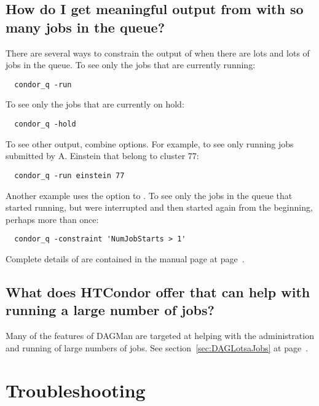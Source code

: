 \subsection*{How do I get meaningful output from  with so many jobs in the queue?}
 
There are several ways to constrain the output of  when there are
lots and lots of jobs in the queue.
To see only the jobs that are currently running:
\begin{verbatim}
  condor_q -run
\end{verbatim}
To see only the jobs that are currently on hold:
\begin{verbatim}
  condor_q -hold
\end{verbatim}
To see other output,  combine options.
For example, to see only running jobs submitted by A. Einstein
that belong to cluster 77:
\begin{verbatim}
  condor_q -run einstein 77
\end{verbatim}
Another example uses the  option to .
To see only the jobs in the queue that started running,
but were interrupted and then started again from the beginning,
perhaps more than once: 
\footnotesize
\begin{verbatim}
  condor_q -constraint 'NumJobStarts > 1'
\end{verbatim}
\normalsize
Complete details of  are contained in the manual page
at page~\pageref{man-condor-q}.

\subsection*{What does HTCondor offer that can help with running
a large number of jobs?}

Many of the features of DAGMan are targeted at helping with the 
administration and running of large numbers of jobs.
See section~\ref{sec:DAGLotsaJobs} at page~\pageref{sec:DAGLotsaJobs}.
 

\section{Troubleshooting}

